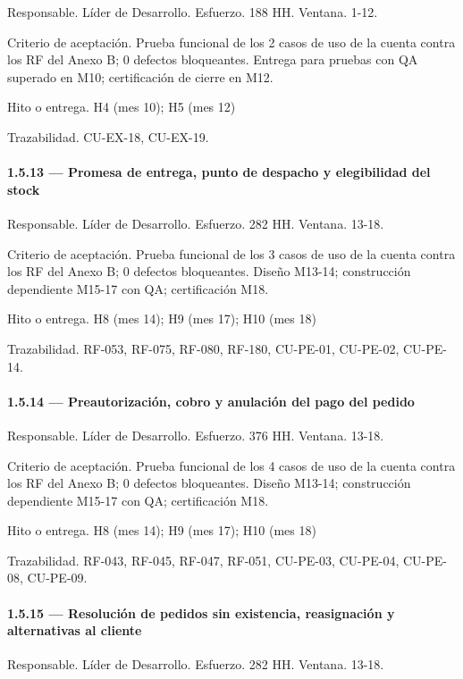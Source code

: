 \documentclass[11pt]{article}
\begin{document}
Responsable. Líder de Desarrollo. Esfuerzo. 188 HH. Ventana. 1-12.

Criterio de aceptación. Prueba funcional de los 2 casos de uso de la cuenta contra los RF del Anexo B; 0 defectos bloqueantes. Entrega para pruebas con QA superado en M10; certificación de cierre en M12.

Hito o entrega. H4 (mes 10); H5 (mes 12)

Trazabilidad. CU-EX-18, CU-EX-19.

\paragraph{1.5.13 — Promesa de entrega, punto de despacho y elegibilidad del stock}

Responsable. Líder de Desarrollo. Esfuerzo. 282 HH. Ventana. 13-18.

Criterio de aceptación. Prueba funcional de los 3 casos de uso de la cuenta contra los RF del Anexo B; 0 defectos bloqueantes. Diseño M13-14; construcción dependiente M15-17 con QA; certificación M18.

Hito o entrega. H8 (mes 14); H9 (mes 17); H10 (mes 18)

Trazabilidad. RF-053, RF-075, RF-080, RF-180, CU-PE-01, CU-PE-02, CU-PE-14.

\paragraph{1.5.14 — Preautorización, cobro y anulación del pago del pedido}

Responsable. Líder de Desarrollo. Esfuerzo. 376 HH. Ventana. 13-18.

Criterio de aceptación. Prueba funcional de los 4 casos de uso de la cuenta contra los RF del Anexo B; 0 defectos bloqueantes. Diseño M13-14; construcción dependiente M15-17 con QA; certificación M18.

Hito o entrega. H8 (mes 14); H9 (mes 17); H10 (mes 18)

Trazabilidad. RF-043, RF-045, RF-047, RF-051, CU-PE-03, CU-PE-04, CU-PE-08, CU-PE-09.

\paragraph{1.5.15 — Resolución de pedidos sin existencia, reasignación y alternativas al cliente}

Responsable. Líder de Desarrollo. Esfuerzo. 282 HH. Ventana. 13-18.
\end{document}
